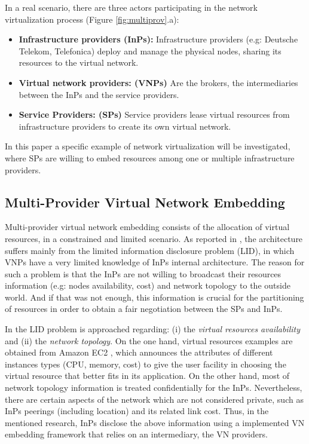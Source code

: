 In a real scenario, there are three actors participating in the network virtualization process (Figure \ref{fig:multiprov}.a): 

\begin{itemize}
	
	\item \textbf{Infrastructure providers (InPs):} Infrastructure providers (e.g: Deutsche Telekom, Telefonica) deploy and manage the physical nodes, sharing its resources to the virtual network.  
	\item \textbf{Virtual network providers: (VNPs)} Are the brokers, the intermediaries between the InPs and the service providers.
	\item \textbf{Service Providers: (SPs)} Service providers lease virtual resources from infrastructure providers to create its own virtual network. 
\end{itemize}

In this paper a specific example of network virtualization will be investigated, where SPs are willing to embed resources among one or multiple infrastructure providers.


\subsection{Multi-Provider Virtual Network Embedding}

Multi-provider virtual network embedding consists of the allocation of virtual resources, in a constrained and limited scenario. As reported in \cite{dietrich2015multi}, the architecture suffers mainly from the limited information disclosure problem (LID), in which VNPs have a very limited knowledge of InPs internal architecture. The reason for such a problem is that the InPs are not willing to broadcast their resources information (e.g: nodes availability, cost) and network topology to the outside world. And if that was not enough, this information is crucial for the partitioning of resources in order to obtain a fair negotiation between the SPs and InPs. 

In \cite{dietrich2015multi} the LID problem is approached regarding: (i) the \textit{virtual resources availability} and (ii) the \textit{network topology}. On the one hand, virtual resources examples are obtained from Amazon EC2 \cite{amazonEC2}, which announces the attributes of different instances types (CPU, memory, cost) to give the user facility in choosing the virtual resource that better fits in its application. On the other hand, most of network topology information is treated confidentially for the InPs. Nevertheless, there are certain aspects of the network which are not considered private, such as InPs peerings (including location) and its related link cost. Thus, in the mentioned research, InPs disclose the above information using a implemented VN embedding framework that relies on an intermediary, the VN providers.

